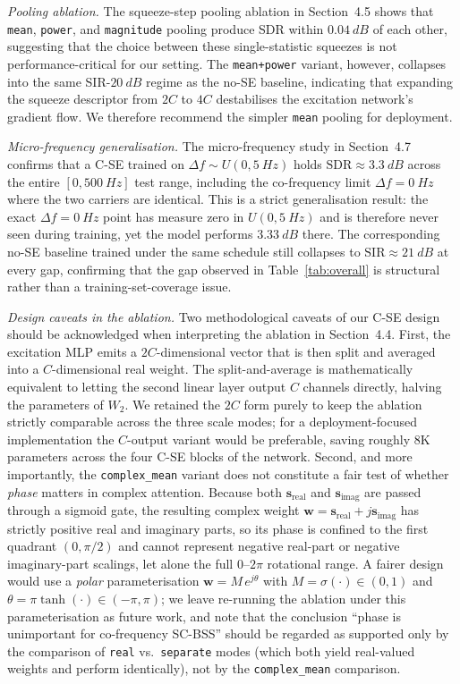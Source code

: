 \documentclass[twocolumn,english]{svjour3}
\begin{document}
\emph{Pooling ablation.} The squeeze-step pooling ablation in Section~4.5 shows that \texttt{mean}, \texttt{power}, and \texttt{magnitude} pooling produce SDR within $\SI{0.04}{dB}$ of each other, suggesting that the choice between these single-statistic squeezes is not performance-critical for our setting. The \texttt{mean+power} variant, however, collapses into the same SIR-$\SI{20}{dB}$ regime as the no-SE baseline, indicating that expanding the squeeze descriptor from $2C$ to $4C$ destabilises the excitation network's gradient flow. We therefore recommend the simpler \texttt{mean} pooling for deployment.

\emph{Micro-frequency generalisation.} The micro-frequency study in Section~4.7 confirms that a C-SE trained on $\Delta f \sim U(0, \SI{5}{Hz})$ holds $\text{SDR}\approx\SI{3.3}{dB}$ across the entire $[0, \SI{500}{Hz}]$ test range, including the co-frequency limit $\Delta f = \SI{0}{Hz}$ where the two carriers are identical. This is a strict generalisation result: the exact $\Delta f = \SI{0}{Hz}$ point has measure zero in $U(0, \SI{5}{Hz})$ and is therefore never seen during training, yet the model performs $\SI{3.33}{dB}$ there. The corresponding no-SE baseline trained under the same schedule still collapses to $\text{SIR}\approx\SI{21}{dB}$ at every gap, confirming that the gap observed in Table~\ref{tab:overall} is structural rather than a training-set-coverage issue.

\emph{Design caveats in the ablation.} Two methodological caveats of our C-SE design should be acknowledged when interpreting the ablation in Section~4.4. First, the excitation MLP emits a $2C$-dimensional vector that is then split and averaged into a $C$-dimensional real weight. The split-and-average is mathematically equivalent to letting the second linear layer output $C$ channels directly, halving the parameters of $W_2$. We retained the $2C$ form purely to keep the ablation strictly comparable across the three scale modes; for a deployment-focused implementation the $C$-output variant would be preferable, saving roughly 8K parameters across the four C-SE blocks of the network. Second, and more importantly, the \texttt{complex\_mean} variant does not constitute a fair test of whether \emph{phase} matters in complex attention. Because both $\mathbf{s}_{\text{real}}$ and $\mathbf{s}_{\text{imag}}$ are passed through a sigmoid gate, the resulting complex weight $\mathbf{w} = \mathbf{s}_{\text{real}} + j\mathbf{s}_{\text{imag}}$ has strictly positive real and imaginary parts, so its phase is confined to the first quadrant $(0, \pi/2)$ and cannot represent negative real-part or negative imaginary-part scalings, let alone the full $0$--$2\pi$ rotational range. A fairer design would use a \emph{polar} parameterisation $\mathbf{w} = M\, e^{j\theta}$ with $M = \sigma(\cdot) \in (0,1)$ and $\theta = \pi \tanh(\cdot) \in (-\pi, \pi)$; we leave re-running the ablation under this parameterisation as future work, and note that the conclusion ``phase is unimportant for co-frequency SC-BSS'' should be regarded as supported only by the comparison of \texttt{real} vs.\ \texttt{separate} modes (which both yield real-valued weights and perform identically), not by the \texttt{complex\_mean} comparison.
\end{document}
